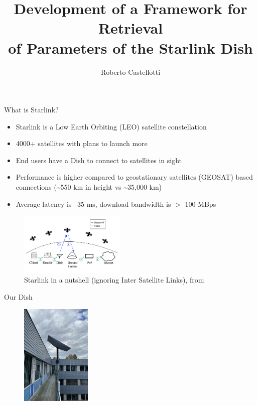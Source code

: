 \documentclass[NET,english,beameralt]{tumbeamer}
\author[Roberto Castellotti]{Roberto Castellotti}
\title[IDP]{Development of a Framework for Retrieval \\ of Parameters of the Starlink Dish}
\date{\displaydate{date}}
\begin{document}
\begin{frame}{What is Starlink?}
    \begin{itemize}
        \item Starlink is a Low Earth Orbiting (LEO) satellite constellation
        \item 4000+ satellites with plans to launch more
        \item End users have a Dish to connect to satellites in sight
        \item Performance is higher compared to geostationary satellites (GEOSAT) based connections (\textasciitilde 550
              km in height vs \textasciitilde 35,000 km)
        \item Average latency is ~35 ms, download bandwidth is $>$ 100 MBps
    \end{itemize}

    \begin{figure}
        \includegraphics[width=0.45\textwidth]{pics/starlink-101.png}
        \caption{Starlink in a nutshell (ignoring Inter Satellite Links), from \cite{izhikevich2023democratizing}}
    \end{figure}
\end{frame}

\begin{frame}{Our Dish}
    \begin{figure}
        \includegraphics[width=0.3\textwidth]{pics/dish.jpeg}
    \end{figure}
\end{frame}
\end{document}

